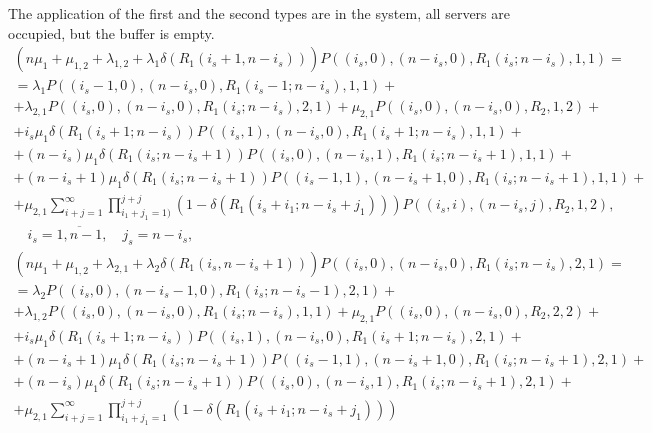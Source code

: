 {The application of the first and the second types are in the system,
all servers are occupied, but the buffer is empty.
\begin{multline}
  \left(n\mu_1+\mu_{1,2}+\lambda_{1,2}+\lambda_1 \delta\left(R_1
      (i_s+1,n-i_s)\right)\right) P\left((i_s,0),(n-i_s,0),R_1
    (i_s;n-i_s),1,1\right) = \\ = \lambda_1
  P\left((i_s-1,0),(n-i_s,0),R_1 (i_s-1;n-i_s),1,1\right)+\\ +
  \lambda_{2,1} P\left((i_s,0),(n-i_s,0),R_1 (i_s;n-i_s),2,1\right)+
  \mu_{2,1} P\left((i_s,0),(n-i_s,0),R_2,1,2\right)+ \\ +
  i_s\mu_1 \delta\left(R_1 (i_s+1;n-i_s)\right)
  P\left((i_s,1),(n-i_s,0),R_1 (i_s+1;n-i_s),1,1\right)+\\ +
  (n-i_s)\mu_1 \delta\left(R_1 (i_s;n-i_s+1)\right)
  P\left((i_s,0),(n-i_s,1),R_1 (i_s;n-i_s+1),1,1\right)+\\ +
  (n-i_s+1)\mu_1 \delta\left(R_1 (i_s;n-i_s+1)\right)
  P\left((i_s-1,1),(n-i_s+1,0),R_1 (i_s;n-i_s+1),1,1\right)+\\ +
  \mu_{2,1} \sum\limits_{i+j=1}^{\infty}\prod\limits_{i_1+j_1=1)}^{j+j}\left(1-\delta\left(R_1 (i_s+i_1;n-i_s+j_1) \right)\right) P\left((i_s,i),(n-i_s,j),R_2,1,2\right), \\
  \quad i_s=\overline{1,n-1}, \quad j_s=n-i_s,
\label{eq:9.1}
\end{multline}
\begin{multline}
  \left(n\mu_1+\mu_{1,2}+\lambda_{2,1}+\lambda_2 \delta\left(R_1
      (i_s,n-i_s+1)\right)\right) P\left((i_s,0),(n-i_s,0),R_1
    (i_s;n-i_s),2,1\right) = \\ = \lambda_2
  P\left((i_s,0),(n-i_s-1,0),R_1 (i_s;n-i_s-1),2,1\right)+\\ +
  \lambda_{1,2} P\left((i_s,0),(n-i_s,0),R_1 (i_s;n-i_s),1,1\right)+
  \mu_{2,1} P\left((i_s,0),(n-i_s,0),R_2,2,2\right)+ \\ + i_s\mu_1
  \delta\left(R_1 (i_s+1;n-i_s)\right) P\left((i_s,1),(n-i_s,0),R_1
    (i_s+1;n-i_s),2,1\right)+\\ + (n-i_s+1)\mu_1 \delta\left(R_1
    (i_s;n-i_s+1)\right) P\left((i_s-1,1),(n-i_s+1,0),R_1
    (i_s;n-i_s+1),2,1\right)+\\ + (n-i_s)\mu_1 \delta\left(R_1
    (i_s;n-i_s+1)\right) P\left((i_s,0),(n-i_s,1),R_1
    (i_s;n-i_s+1),2,1\right)+\\ + \mu_{2,1}
  \sum\limits_{i+j=1}^{\infty}\prod\limits_{i_1+j_1=1}^{j+j}\left(1-\delta\left(R_1
      (i_s+i_1;n-i_s+j_1) \right)\right)

\end{multline}}
